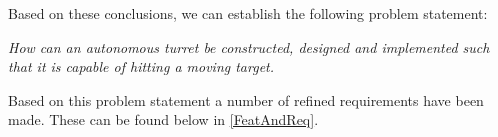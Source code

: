 Based on these conclusions, we can establish the following
problem statement:

\begin{center}
\begin{minipage}{0.8\linewidth}
\textit{How can an autonomous turret be constructed, designed and implemented
such that it is capable of hitting a moving target.}
\end{minipage}
\end{center}


Based on this problem statement a number of refined requirements have been made.
These can be found below in \autoref{FeatAndReq}. 
